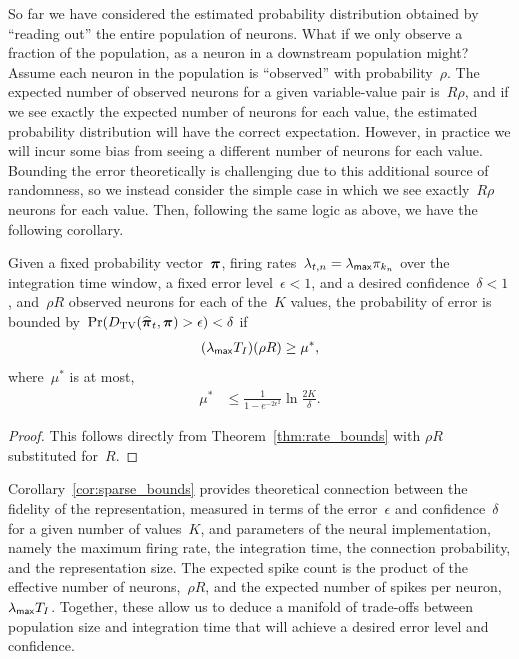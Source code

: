 
So far we have considered the estimated probability distribution
obtained by ``reading out'' the entire population of neurons. What if
we only observe a fraction of the population, as a neuron in a
downstream population might? Assume each neuron in the population is 
``observed'' with probability~$\rho$. The expected number of observed 
neurons for a given variable-value pair is~$R\rho$, and if we see 
exactly the expected number of neurons for each value, the estimated 
probability distribution will have the correct expectation. However, 
in practice we will incur some bias from seeing a different number of 
neurons for each value. Bounding the error theoretically is challenging 
due to this additional source of randomness, so we instead consider 
the simple case in which we see exactly~$R \rho$ neurons for each value.
Then, following the same logic as above, we have the following 
corollary.

\begin{corollary}
  \label{cor:sparse_bounds}
  Given a fixed probability vector~$\boldsymbol{\pi}$, firing
  rates~$\lambda_{t,n} = \lambda_{\mathsf{max}} \pi_{k_n}$ over the
  integration time window, a fixed error level~$\epsilon < 1$, and a
  desired confidence~$\delta < 1$, and~$\rho R$ observed neurons for
  each of the~$K$ values, the probability of error is bounded
  by~$\Pr({D_{\mathrm{TV}}}(\widehat{\boldsymbol{\pi}}_t, \boldsymbol{\pi}) > \epsilon) < \delta$ if
  \begin{align*}
    (\lambda_{\mathsf{max}} T_I) (\rho R) \geq \mu^*,
  \end{align*} 
  where~$\mu^*$ is at most,
  \begin{align*}
    \mu^* &\leq \frac{1}{1-e^{-2\epsilon^2}} \ln \frac{2K}{\delta}.  
  \end{align*}
\end{corollary}

\begin{proof}
  This follows directly from Theorem~\ref{thm:rate_bounds} with $\rho R$ substituted for~$R$.
\end{proof}

Corollary~\ref{cor:sparse_bounds} provides theoretical connection
between the fidelity of the representation, measured in terms of the
error~$\epsilon$ and confidence~$\delta$ for a given number of
values~$K$, and parameters of the neural implementation, namely the
maximum firing rate, the integration time, the connection probability,
and the representation size.  The expected spike count is the product
of the effective number of neurons,~$\rho R$, and the expected number
of spikes per neuron,~$\lambda_{\mathsf{max}} T_I$.  Together, these allow us to
deduce a manifold of trade-offs between population size and
integration time that will achieve a desired error level and
confidence. 


